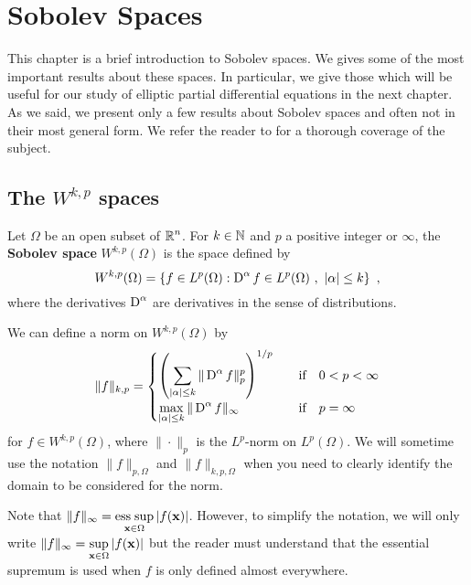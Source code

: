 \chapter{Sobolev Spaces} \label{sobolev_chap}

This chapter is a brief introduction to Sobolev spaces.  We gives some
of the most important results about these spaces.  In particular, we
give those which will be useful for our study of elliptic partial
differential equations in the next chapter.  As we said, we present only a
few results about Sobolev spaces and often not in their most general
form.  We refer the reader to \cite{Ad} for a thorough coverage of the
subject.

\section{The $\displaystyle W^{k,p}$ spaces} \label{sobolev_def}

\begin{defn} \label{sob_1st_wkp}
Let $\Omega$ be an open subset of $\displaystyle \mathbb{R}^n$.  For $k\in \mathbb{N}$ and
$p$ a positive integer or $\infty$, the
{\bfseries Sobolev space}
$\displaystyle W^{k,p}(\Omega)$ is the space defined by
\[
W^{k,p}(\Omega) = \left\{ f \in L^p(\Omega) : \operatorname{D}^\alpha f \in
  L^p(\Omega) \ , \ |\alpha| \leq k \right\} \ ,
\]
where the derivatives $\displaystyle \operatorname{D}^\alpha$ are derivatives in
the sense of distributions.
\end{defn}

We can define a norm on $\displaystyle W^{k,p}(\Omega)$ by
\begin{equation} \label{sob_norm_wkp}
\| f \|_{k,p} =
\begin{cases}
\displaystyle \left( \sum_{|\alpha|\leq k} \| \operatorname{D}^\alpha f \|_p^p \right)^{1/p}&
\quad \text{if} \quad 0 < p < \infty \\
\displaystyle \max_{|\alpha|\leq k} \| \operatorname{D}^\alpha f \|_\infty &
\quad \text{if} \quad p = \infty
\end{cases}
\end{equation}
for $\displaystyle f \in W^{k,p}(\Omega)$, where $\|\cdot\|_p$ is the
$\displaystyle L^p$-norm on $\displaystyle L^p(\Omega)$.
We will sometime use the notation $\|f\|_{p,\Omega}$ and
$\|f\|_{k,p,\Omega}$ when you
need to clearly identify the domain to be considered for the norm.

Note that
$\displaystyle \|f\|_\infty = \operatorname*{ess\;sup}_{\mathbf{x} \in \Omega} |f(\mathbf{x})|$.
However, to simplify the notation, we will only write
$\displaystyle \|f\|_\infty = \sup_{\mathbf{x} \in \Omega} |f(\mathbf{x})|$
but the reader must understand that the essential supremum is used
when $f$ is only defined almost everywhere.

